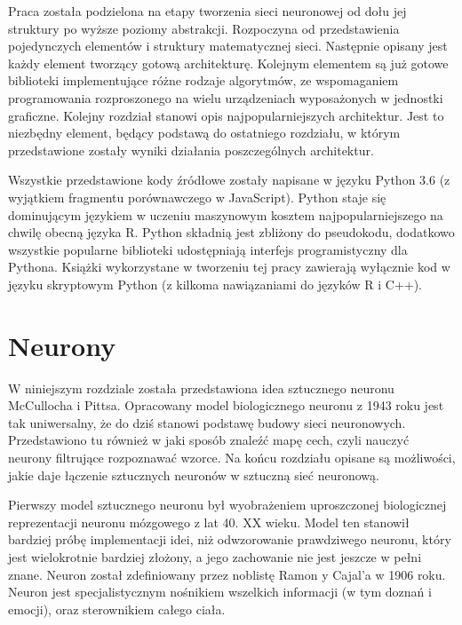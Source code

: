 \documentclass[12pt,a4paper,twoside,titlepage,openright]{book}
\begin{document}
Praca została podzielona na etapy tworzenia sieci neuronowej od dołu jej struktury po wyższe poziomy abstrakcji. Rozpoczyna od przedstawienia pojedynczych elementów i struktury matematycznej sieci. Następnie opisany jest każdy element tworzący gotową architekturę. Kolejnym elementem są już gotowe biblioteki implementujące różne rodzaje algorytmów, ze wspomaganiem programowania rozproszonego na wielu urządzeniach wyposażonych w jednostki graficzne. Kolejny rozdział stanowi opis najpopularniejszych architektur. Jest to niezbędny element, będący podstawą do ostatniego rozdziału, w którym przedstawione zostały wyniki działania poszczególnych architektur.

Wszystkie przedstawione kody źródłowe zostały napisane w języku Python 3.6 (z wyjątkiem fragmentu porównawczego w JavaScript). Python staje się dominującym językiem w uczeniu maszynowym kosztem najpopularniejszego na chwilę obecną języka R. \cite{sitePythonvR} Python składnią jest zbliżony do pseudokodu, dodatkowo wszystkie popularne biblioteki udostępniają interfejs programistyczny dla Pythona. Książki wykorzystane w tworzeniu tej pracy zawierają wyłącznie kod w języku skryptowym Python (z kilkoma nawiązaniami do języków R i C++).


\chapter{Neurony}
W niniejszym rozdziale została przedstawiona idea sztucznego neuronu McCullocha i Pittsa. Opracowany model biologicznego neuronu z 1943 roku jest tak uniwersalny, że do dziś stanowi podstawę budowy sieci neuronowych. Przedstawiono tu również w jaki sposób znaleźć mapę cech, czyli nauczyć neurony filtrujące rozpoznawać wzorce. Na końcu rozdziału opisane są możliwości, jakie daje łączenie sztucznych neuronów w sztuczną sieć neuronową.

Pierwszy model sztucznego neuronu był wyobrażeniem uproszczonej biologicznej reprezentacji neuronu mózgowego z lat 40. XX wieku. Model ten stanowił bardziej próbę implementacji idei, niż odwzorowanie prawdziwego neuronu, który jest wielokrotnie bardziej złożony, a jego zachowanie nie jest jeszcze w pełni znane. Neuron został zdefiniowany przez noblistę Ramon y Cajal'a w 1906 roku. Neuron jest specjalistycznym nośnikiem wszelkich informacji (w tym doznań i emocji), oraz sterownikiem całego ciała.
\end{document}
